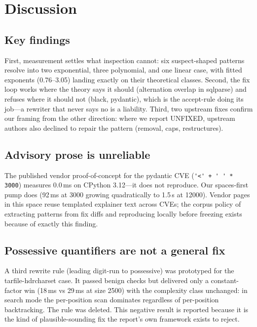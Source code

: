 \documentclass[11pt,a4paper]{article}
\begin{document}
\section{Discussion}
\label{sec:discussion}

\subsection{Key findings}

First, measurement settles what inspection cannot: six suspect-shaped patterns resolve into two exponential, three polynomial, and one linear case, with fitted exponents (0.76--3.05) landing exactly on their theoretical classes. Second, the fix loop works where the theory says it should (alternation overlap in sqlparse) and refuses where it should not (black, pydantic), which is the accept-rule doing its job---a rewriter that never says no is a liability. Third, two upstream fixes confirm our framing from the other direction: where we report UNFIXED, upstream authors also declined to repair the pattern (removal, caps, restructures).

\subsection{Advisory prose is unreliable}

The published vendor proof-of-concept for the pydantic CVE (\verb!'<' + ' ' * 3000!) measures 0.0\,ms on CPython 3.12---it does not reproduce. Our spaces-first pump does (92\,ms at 3000 growing quadratically to 1.5\,s at 12000). Vendor pages in this space reuse templated explainer text across CVEs; the corpus policy of extracting patterns from fix diffs and reproducing locally before freezing exists because of exactly this finding.

\subsection{Possessive quantifiers are not a general fix}

A third rewrite rule (leading digit-run to possessive) was prototyped for the tarfile-hdrcharset case. It passed benign checks but delivered only a constant-factor win (18\,ms vs 29\,ms at size 2500) with the complexity class unchanged: in search mode the per-position scan dominates regardless of per-position backtracking. The rule was deleted. This negative result is reported because it is the kind of plausible-sounding fix the report's own framework exists to reject.
\end{document}
